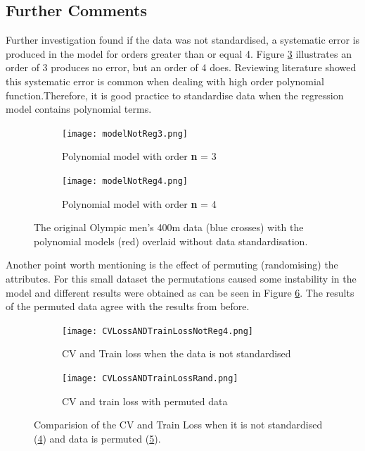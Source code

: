 {\subsection{Further Comments}
Further investigation found if the data was not standardised, a systematic error is produced in the model for orders greater than or equal 4. Figure \ref{men400-1noSt} illustrates an order of 3 produces no error, but an order of 4 does. Reviewing literature showed this systematic error is common when dealing with high order polynomial function\cite{WhenIsIt}.Therefore, it is good practice to standardise data when the regression model contains polynomial terms.

\begin{figure}[h!] 
	\centering
	\begin{subfigure}[b]{0.4\textwidth}
		\texttt{[image: modelNotReg3.png]}
		\caption{Polynomial model with order \textbf{n} = 3}
		\label{fig:modelNoReg0}
	\end{subfigure}
	\begin{subfigure}[b]{0.4\textwidth}
		\texttt{[image: modelNotReg4.png]}
		\caption{Polynomial model with order \textbf{n} = 4}
		\label{fig:modelNoReg1}
	\end{subfigure}
	\caption{The original Olympic men's 400m data (blue crosses) with the polynomial models (red) overlaid without data standardisation.}
	\label{men400-1noSt}
\end{figure}

Another point worth mentioning is the effect of permuting (randomising) the attributes. For this small dataset the permutations caused some instability in the model and different results were obtained as can be seen in Figure \ref{men400CVRandSt}. The results of the permuted data agree with the results from before.

\begin{figure}[h!] 
	\centering
	\begin{subfigure}[b]{0.35\textwidth}
		\texttt{[image: CVLossANDTrainLossNotReg4.png]}
		\caption{CV and Train loss when the data is not standardised}
		\label{fig:modelNoRegCV}
	\end{subfigure}
	\begin{subfigure}[b]{0.35\textwidth}
		\texttt{[image: CVLossANDTrainLossRand.png]}
		\caption{CV and train loss with permuted data}
		\label{fig:modelRand}
	\end{subfigure}
	\caption{Comparision of the CV and Train Loss when it is not standardised (\ref{fig:modelNoRegCV}) and data is permuted (\ref{fig:modelRand}).}
	\label{men400CVRandSt}
\end{figure}

}
